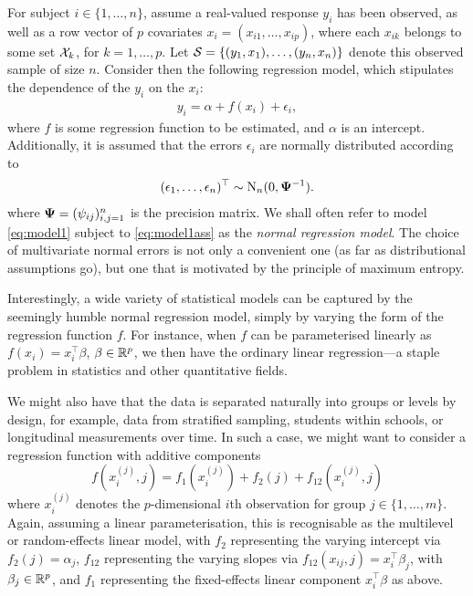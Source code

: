 \documentclass[a4paper,showframe,11pt]{report}
\begin{document}
For subject $i \in \{1,\dots,n\}$, assume a real-valued response $y_i$ has been observed, as well as a row vector of $p$ covariates $x_i = (x_{i1},\dots,x_{ip})$, where each $x_{ik}$ belongs to some set ${\mathcal X}_k$, for $k = 1,\dots,p$.
Let ${\mathcal S} = \{(y_1, x_1), \dots, (y_n,x_n)\}$ denote this observed sample of size $n$.
Consider then the following regression model, which stipulates the dependence of the $y_i$ on the $x_i$:
\begin{align}\label{eq:model1}
  y_i = \alpha + f(x_i) + \epsilon_i,
\end{align}
where $f$ is some regression function to be estimated, and $\alpha$ is an intercept.
Additionally, it is assumed that the errors $\epsilon_i$ are normally distributed according to
\begin{align}\label{eq:model1ass}
  (\epsilon_1, \dots, \epsilon_n)^\top \sim \operatorname{N}_n(0, {\bm\Psi}^{-1}).
\end{align}
where ${\bm\Psi} = (\psi_{ij})_{i,j=1}^n$ is the precision matrix.
We shall often refer to model \cref{eq:model1} subject to \cref{eq:model1ass} as the \emph{normal regression model}.
The choice of multivariate normal errors is not only a convenient one (as far as distributional assumptions go), but one that is motivated by the principle of maximum entropy.

Interestingly, a wide variety of statistical models can be captured by the seemingly humble normal regression model, simply by varying the form of the regression function $f$.
For instance, when $f$ can be parameterised linearly as $f(x_i) = x_i^\top \beta$, $\beta \in \mathbb{R}^p$, we then have the ordinary linear regression---a staple problem in statistics and other quantitative fields.

We might also have that the data is separated naturally into groups or levels by design, for example, data from stratified sampling, students within schools, or longitudinal measurements over time.
In such a case, we might want to consider a regression function with additive components
%
\[
  f(x_i^{(j)}, j) = f_1(x_i^{(j)}) + f_2(j) + f_{12}(x_i^{(j)}, j)
\]
%
where $x_i^{(j)}$ denotes the $p$-dimensional $i$th observation for group $j\in\{1,\dots,m\}$.
Again, assuming a linear parameterisation, this is recognisable as the multilevel or random-effects linear model, with $f_2$ representing the varying intercept via $f_2(j) = \alpha_{j}$, $f_{12}$ representing the varying slopes via $f_{12}(x_{ij},j) = x_{i}^\top \beta_{j}$, with $\beta_j \in \mathbb{R}^p$, and $f_1$ representing the fixed-effects linear component $x_i^\top\beta$ as above.
\end{document}
